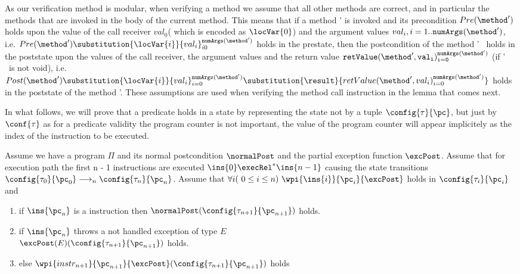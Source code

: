 As our verification method is modular, when verifying a method we assume that all other methods are correct, and in particular the methods that are invoked in the body of the current method. This means that if a method \method' is invoked and its precondition  $Pre( \method')$ holds upon the value of the call receiver $val_0$( which is encoded as $\locVar{0}$) and the argument values $val_i , i = 1.. \tt{numArgs}(\method')$, i.e.  
$Pre( \method') \substitution{\locVar{i}}{val_i}_{i0}^{ \tt{numArgs}( \method')}$ holds in the prestate,
 then the postcondition of the method \method' \ holds in the poststate upon the values of the call receiver, the argument values and the return value 
$\tt{retValue}(\method', val_i)_{i=0}^{\tt{numArgs}( \method')} $
(if \method' \ is not void), i.e. 
$Post( \method') \substitution{\locVar{i}}{val_i}_{i=0}^{\tt{numArgs}( \method')} \substitution{\result}{retValue(\method', val_i)_{i=0}^{\tt{numArgs}( \method')} }$
holds in the poststate of the method \method'. These assumptions are used when verifying the method call instruction in the lemma that comes next.


In what follows, we will prove that a predicate holds in a state by representing the state not by a tuple $\config{\tau}{\pc}$, but just by $\conf{\tau}$ as for a predicate 
validity the program counter is not important, the value of the  program counter will appear implicitely as the index of the instruction to be executed. 

\begin{lemma1} \label{lemma1}
Assume we have a program $\Pi$ and its normal postcondition  $\normalPost$ and the partial exception function $\excPost$. 
Assume that for execution path the first n - 1 instructions are executed $\ins{0} \execRel^*  \ins{n-1} $ 
causing the state transitions 
$\config{\state{0}}{\pc_0}  \longrightarrow_{n} \config{\state{n}}{\pc_{n}}  $.
Assume that  $ \forall i (\ 0 \leq i \leq n ) \ \wpi{\ins{i}}{ \pc_i }{\excPost}$  holds in 
$\config{\state{i}}{\pc_{i} } $ and
\begin{enumerate}
	\item if $\ins{{\pc_n}}$ is a  instruction then $\normalPost (\config{\state{n+1}}{\pc_{n+1}})$ holds.  
	
	\item if $\ins{{\pc_n}}$ throws a not handled exception of type $E$ \\
	$\excPost(E) (\config{\state{n+1}}{\pc_{n+1}} )$ holds. 
 
	\item else $\wpi{instr_{n+1}}{\pc_{n+1} }{\excPost}  (\config{\state{n+1}}{\pc_{n+1}} ) $ holds
\end{enumerate}
\end{lemma1}


